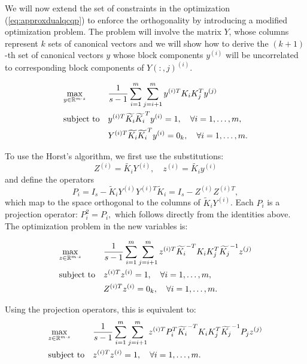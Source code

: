 We will now extend the set of constraints in the optimization (\ref{eq:approxdualqcqp})
to enforce the orthogonality by introducing a modified optimization problem. The problem
will involve the matrix $Y$, whose columns represent $k$ sets of canonical vectors and
we will show how to derive the $(k+1)$-th set of canonical vectors $y$ whose block components $y^{(i)}$
will be uncorrelated to corresponding block components of $Y(:,j)^{(i)}$.

 \begin{equation}\label{eq:kdimapproxdualqcqp}
\begin{aligned}
& \underset{y \in \mathbb{R}^{m\cdot s}}{\text{max}}
& & \frac{1}{s -1} \sum_{i = 1}^m \sum_{j = i+1}^m y^{(i)T} K_i K_j^T y^{(j)}\\
& \text{subject to}
& & y^{(i)T} \widetilde{K_i} \widetilde{K_i}^T y^{(i)} = 1, \quad\forall i = 1,\ldots, m,\\
& & & Y^{(i)T} \widetilde{K_i} \widetilde{K_i}^T y^{(i)} = 0_k, \quad\forall i = 1,\ldots, m.
\end{aligned}
\end{equation}

To use the Horst's algorithm, we first use the substitutions:
$$Z^{(i)} = \widetilde{K_i}Y^{(i)}, \quad z^{(i)} = \widetilde{K_i}y^{(i)}$$
and define the operators $$P_i = I_s - \widetilde{K}_i Y^{(i)} Y^{(i)T} \widetilde{K}_i = I_s - Z^{(i)} Z^{(i)T},$$
which map to the space orthogonal to the columns of $\widetilde{K}_i Y^{(i)}$.
Each $P_i$ is a projection operator: $P_i^2 = P_i,$ which follows directly from the identities above.
The optimization problem in the new variables is:

 \begin{equation}\label{eq:Zkdimapproxdualqcqp}
\begin{aligned}
& \underset{z \in \mathbb{R}^{m\cdot s}}{\text{max}}
& & \frac{1}{s -1} \sum_{i = 1}^m \sum_{j = i+1}^m z^{(i)T} \widetilde{K_i}^{-T} K_i K_j^T \widetilde{K_j}^{-1} z^{(j)} \\
& \text{subject to}
& & z^{(i)T}  z^{(i)} = 1, \quad\forall i = 1,\ldots, m,\\
& & & Z^{(i)T} z^{(i)} = 0_k, \quad\forall i = 1,\ldots, m.
\end{aligned}
\end{equation}

Using the projection operators, this is equivalent to:
\begin{equation*}
\begin{aligned}
& \underset{z \in \mathbb{R}^{m\cdot s}}{\text{max}}
& & \frac{1}{s -1} \sum_{i = 1}^m \sum_{j = i+1}^m z^{(i)T} P_i^T \widetilde{K_i}^{-T} K_i K_j^T \widetilde{K_j}^{-1} P_j z^{(j)}\\
& \text{subject to}
& & z^{(i)T}  z^{(i)} = 1, \quad\forall i = 1,\ldots, m.
\end{aligned}
\end{equation*}

